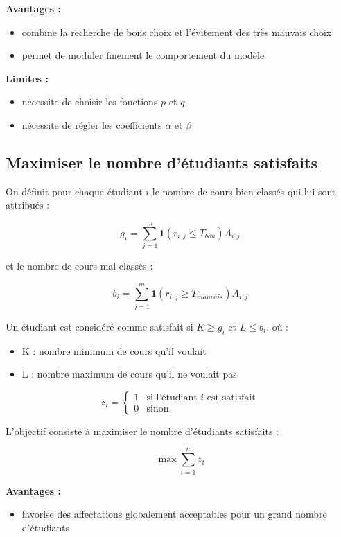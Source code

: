 \documentclass[11pt]{article}
\begin{document}
\textbf{Avantages :}

\begin{itemize}
\item combine la recherche de bons choix et l'évitement des très mauvais choix
\item permet de moduler finement le comportement du modèle
\end{itemize}

\textbf{Limites :}

\begin{itemize}
\item nécessite de choisir les fonctions $p$ et $q$
\item nécessite de régler les coefficients $\alpha$ et $\beta$
\end{itemize}

\subsection{Maximiser le nombre d'étudiants satisfaits}

On définit pour chaque étudiant $i$ le nombre de cours bien classés
qui lui sont attribués :

\[
g_i = \sum_{j=1}^{m} \mathbf{1}(r_{i,j} \leq T_{bon}) A_{i,j}
\]

et le nombre de cours mal classés :

\[
b_i = \sum_{j=1}^{m} \mathbf{1}(r_{i,j} \geq T_{mauvais}) A_{i,j}
\]

Un étudiant est considéré comme satisfait si $K \geq g_i$
et $L \leq b_i$, où :
\begin{itemize}
\item K : nombre minimum de cours qu'il voulait
\item L : nombre maximum de cours qu'il ne voulait pas
\end{itemize}

\[
z_i =
\begin{cases}
1 & \text{si l'étudiant } i \text{ est satisfait} \\
0 & \text{sinon}
\end{cases}
\]

L'objectif consiste à maximiser le nombre d'étudiants satisfaits :

\[
\max \sum_{i=1}^{n} z_i
\]

\textbf{Avantages :}

\begin{itemize}
\item favorise des affectations globalement acceptables pour un grand nombre d'étudiants
\end{itemize}
\end{document}
